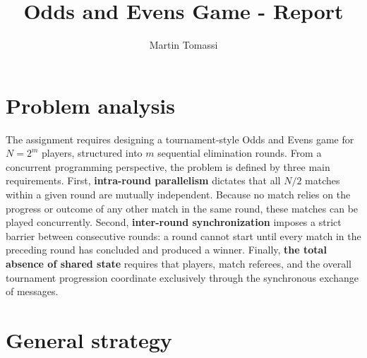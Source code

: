 \documentclass[11pt,a4paper]{article}
\title{\textbf{Odds and Evens Game - Report}}
\author{Martin Tomassi}
\date{}
\begin{document}
\maketitle

\section{Problem analysis}

The assignment requires designing a tournament-style Odds and Evens game for $N = 2^m$ players, structured into $m$ sequential elimination rounds. From a concurrent programming perspective, the problem is defined by three main requirements. First, \textbf{intra-round parallelism} dictates that all $N/2$ matches within a given round are mutually independent. Because no match relies on the progress or outcome of any other match in the same round, these matches can be played concurrently. Second, \textbf{inter-round synchronization} imposes a strict barrier between consecutive rounds: a round cannot start until every match in the preceding round has concluded and produced a winner. Finally, \textbf{the total absence of shared state} requires that players, match referees, and the overall tournament progression coordinate exclusively through the synchronous exchange of messages.

\section{General strategy}
\end{document}

